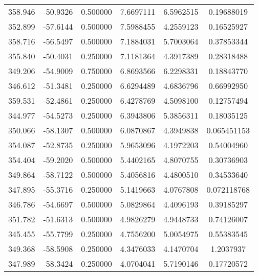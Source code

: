\documentclass{article}
\begin{document}
\begin{tabular}{| c | c | c | c | c | c |}
      358.946 &      -50.9326 &      0.500000 &        7.6697111 & 
       6.5962515 &       0.19688019\\
      352.899 &      -57.6144 &      0.500000 &        7.5988455 & 
       4.2559123 &       0.16525927\\
      358.716 &      -56.5497 &      0.500000 &        7.1884031 & 
       5.7003064 &       0.37853344\\
      355.840 &      -50.4031 &      0.250000 &        7.1181364 & 
       4.3917389 &       0.28318488\\
      349.206 &      -54.9009 &      0.750000 &        6.8693566 & 
       6.2298331 &       0.18843770\\
      346.612 &      -51.3481 &      0.250000 &        6.6294489 & 
       4.6836796 &       0.66992950\\
      359.531 &      -52.4861 &      0.250000 &        6.4278769 & 
       4.5098100 &       0.12757494\\
      344.977 &      -54.5273 &      0.250000 &        6.3943806 & 
       5.3856311 &       0.18035125\\
      350.066 &      -58.1307 &      0.500000 &        6.0870867 & 
       4.3949838 &      0.065451153\\
      354.087 &      -52.8735 &      0.250000 &        5.9653096 & 
       4.1972203 &       0.54004960\\
      354.404 &      -59.2020 &      0.500000 &        5.4402165 & 
       4.8070755 &       0.30736903\\
      349.864 &      -58.7122 &      0.500000 &        5.4056816 & 
       4.4800510 &       0.34533640\\
      347.895 &      -55.3716 &      0.250000 &        5.1419663 & 
       4.0767808 &      0.072118768\\
      346.786 &      -54.6697 &      0.500000 &        5.0829864 & 
       4.4096193 &       0.39185297\\
      351.782 &      -51.6313 &      0.500000 &        4.9826279 & 
       4.9448733 &       0.74126007\\
      345.455 &      -55.7799 &      0.250000 &        4.7556200 & 
       5.0054975 &       0.55383545\\
      349.368 &      -58.5908 &      0.250000 &        4.3476033 & 
       4.1470704 &        1.2037937\\
      347.989 &      -58.3424 &      0.250000 &        4.0704041 & 
       5.7190146 &       0.17720572\\
      \hline  
\end{tabular}
\end{document}
